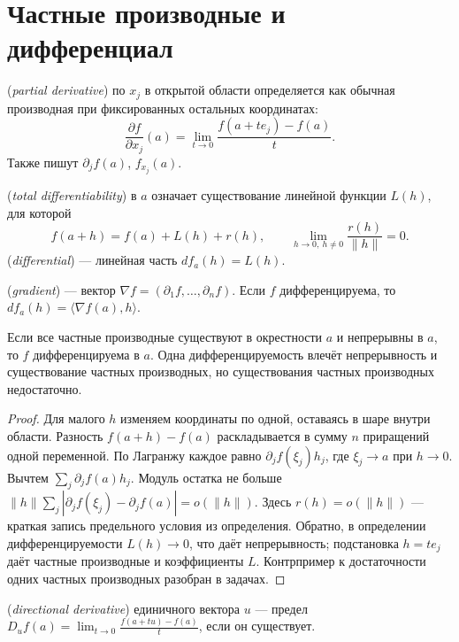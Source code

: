 \section{Частные производные и дифференциал}
\begin{definition} (\emph{partial derivative}) по \(x_j\) в открытой области определяется как обычная производная при фиксированных остальных координатах:
\[
\frac{\partial f}{\partial x_j}(a)
=\lim_{t\to0}\frac{f(a+te_j)-f(a)}t.
\]
Также пишут \(\partial_jf(a)\), \(f_{x_j}(a)\).
\end{definition}
\begin{definition} (\emph{total differentiability}) в \(a\) означает существование линейной функции \(L(h)\), для которой
\[
f(a+h)=f(a)+L(h)+r(h),\qquad
\lim_{h\to0,\ h\ne0}\frac{r(h)}{\|h\|}=0.
\]
 (\emph{differential}) — линейная часть \(df_a(h)=L(h)\).
\end{definition}
\begin{definition} (\emph{gradient}) — вектор \(\nabla f=(\partial_1f,\ldots,\partial_nf)\). Если \(f\) дифференцируема, то \(df_a(h)=\langle\nabla f(a),h\rangle\).\end{definition}
\begin{theorem}
Если все частные производные существуют в окрестности \(a\) и непрерывны в \(a\), то \(f\) дифференцируема в \(a\). Одна дифференцируемость влечёт непрерывность и существование частных производных, но существования частных производных недостаточно.
\end{theorem}
\begin{proof}Для малого \(h\) изменяем координаты по одной, оставаясь в шаре внутри области. Разность \(f(a+h)-f(a)\) раскладывается в сумму \(n\) приращений одной переменной. По Лагранжу каждое равно \(\partial_jf(\xi_j)h_j\), где \(\xi_j\to a\) при \(h\to0\). Вычтем \(\sum_j\partial_jf(a)h_j\). Модуль остатка не больше \(\|h\|\sum_j|\partial_jf(\xi_j)-\partial_jf(a)|=o(\|h\|)\). Здесь \(r(h)=o(\|h\|)\) — краткая запись предельного условия из определения. Обратно, в определении дифференцируемости \(L(h)\to0\), что даёт непрерывность; подстановка \(h=te_j\) даёт частные производные и коэффициенты \(L\). Контрпример к достаточности одних частных производных разобран в задачах.\end{proof}
\begin{definition} (\emph{directional derivative}) единичного вектора \(u\) — предел \(D_uf(a)=\lim_{t\to0}\frac{f(a+tu)-f(a)}t\), если он существует.\end{definition}
